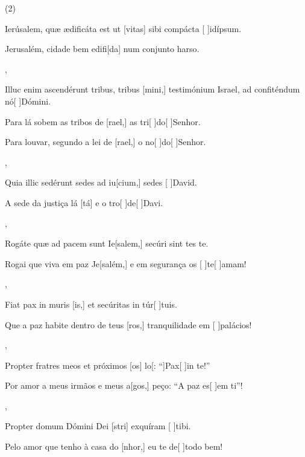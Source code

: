 \SetVersePairs(2){
  {\item {}Ierúsalem, quæ ædificáta est ut [vitas] sibi compácta [ ]{id}{íp}sum.~\Responsorium}%
    {\item {}Jerusalém, cidade bem edifi[da] num conjunto harso.~\Responsorium},
  {\item {}Illuc enim ascendérunt tribus, tribus [mini,] testimónium Israel, ad confiténdum nó[ ]{Dó}mini.~\Responsorium}%
    {\item {}Para lá sobem as tribos de [rael,] as tri[ ]{do}[ ]{Se}\-nhor. \item {}Para louvar, segundo a lei de [rael,] o no[ ]{do}[ ]{Se}nhor.~\Responsorium},
  {\item {}Quia illic sedérunt sedes ad iu[cium,] sedes [ ]{Da}\-vid.~\Responsorium}%
    {\item {}A sede da justiça lá [tá] e o tro[ ]{de}[ ]{Da}vi.~\Responsorium},
  {\item {}Rogáte quæ ad pacem sunt Ie[salem,] secúri sint \-tes te.~\Responsorium}%
    {\item {}Rogai que viva em paz Je[salém,] e em segurança os [ ]{te}[ ]{a}mam!~\Responsorium},
  {\item {}Fiat pax in muris [is,] et secúritas in túr[ ]{tu}is.~\Responsorium}%
    {\item {}Que a paz habite dentro de teus [ros,] tranquilidade em [ ]{pa}{lá}cios!~\Responsorium},
  {\item {}Propter fratres meos et próximos [os] lo[: ``]{Pax}[ ]{in} te!''~\Responsorium}%
    {\item {}Por amor a meus irmãos e meus a[gos,] peço: ``A paz es[ ]{em} ti''!~\Responsorium},
  {\item {}Propter domum Dómini Dei [stri] exquíram [ ]{ti}bi.~\Responsorium}%
    {\item {}Pelo amor que tenho à casa do [nhor,] eu te de[ ]{to}do bem!~\Responsorium}
}
